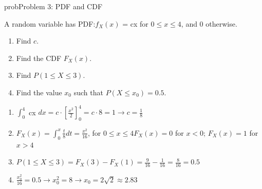 \begin{PSbox}[unbreakable]{prob}{Problem 3: PDF and CDF}

A random variable has PDF:\PSbr{}$f_{X}(x)$ = cx for $0 \le x \le 4$, and 0 otherwise.

\begin{enumerate}
\def\labelenumi{(\alph{enumi})}
\tightlist
\item
  Find $c$.
\item
  Find the CDF $F_{X}(x)$.
\item
  Find $P(1 \le X \le 3)$.
\item
  Find the value $x_{0}$ such that $P(X \le x_{0}) = 0.5$.
\end{enumerate}

\PSsolution{} 

\begin{enumerate}
\def\labelenumi{(\alph{enumi})}
\item
  $\int_{0}^{4}$ cx $dx = c \cdot \left[\frac{x^{2}}{2}\right]_{0}^{4} = c \cdot 8 = 1 \to c = \frac{1}{8}$
\item
  $F_{X}(x) = \int_{0}^{x} \frac{t}{8}dt = \frac{x^{2}}{16}$, for $0 \le x \le 4$\PSbr{}$F_{X}(x) = 0$ for $x < 0$; $F_{X}(x) = 1$ for $x > 4$
\item
  $\displaystyle P(1 \le X \le 3) = F_{X}(3) - F_{X}(1) = \frac{9}{16} - \frac{1}{16} = \frac{8}{16} = 0.5$
\item
  $\displaystyle \frac{x_{0}^{2}}{16} = 0.5 \to x_{0}^{2} = 8 \to x_{0} = 2\sqrt{2} \approx 2.83$
\end{enumerate}

\end{PSbox}

